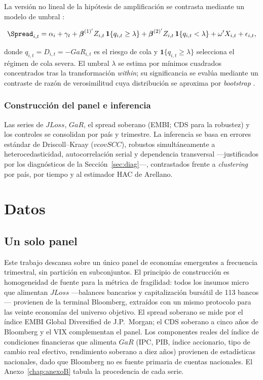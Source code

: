 La versión no lineal de la hipótesis de amplificación se contrasta mediante un modelo de umbral \citep{Hansen1999,Hansen2000}:

\[ \Spread_{i,t} = \alpha_i + \gamma_t + \boldsymbol{\beta}^{(1)'} Z_{i,t}\,\mathbf{1}\{q_{i,t}\ge\lambda\} + \boldsymbol{\beta}^{(2)'} Z_{i,t}\,\mathbf{1}\{q_{i,t}<\lambda\} + \omega'X_{i,t} + \epsilon_{i,t}, \]

donde $q_{i,t}=D_{i,t}=-GaR_{i,t}$ es el riesgo de cola y $\mathbf{1}\{q_{i,t}\ge\lambda\}$ selecciona el régimen de cola severa. El umbral $\lambda$ se estima por mínimos cuadrados concentrados tras la transformación \textit{within}; su significancia se evalúa mediante un contraste de razón de verosimilitud cuya distribución se aproxima por \textit{bootstrap} \citep{Hansen2000}.

\subsubsection{Construcción del panel e inferencia}

Las series de $JLoss$, $GaR$, el spread soberano (EMBI; CDS para la robustez) y los controles se consolidan por país y trimestre. La inferencia se basa en errores estándar de Driscoll–Kraay \citep{DriscollKraay1998} ($vcovSCC$), robustos simultáneamente a heterocedasticidad, autocorrelación serial y dependencia transversal —justificados por los diagnósticos de la Sección~\ref{sec:diag}—, contrastados frente a \textit{clustering} por país, por tiempo y al estimador HAC de Arellano.

\section{Datos}

\subsection{Un solo panel}

Este trabajo descansa sobre un único panel de economías emergentes a frecuencia trimestral, sin partición en subconjuntos. El principio de construcción es homogeneidad de fuente para la métrica de fragilidad: todos los insumos micro que alimentan $JLoss$ —balances bancarios y capitalización bursátil de 113 bancos— provienen de la terminal Bloomberg, extraídos con un mismo protocolo para las veinte economías del universo objetivo. El spread soberano se mide por el índice EMBI Global Diversified de J.P.\ Morgan; el CDS soberano a cinco años de Bloomberg y el VIX complementan el panel. Los componentes reales del índice de condiciones financieras que alimenta $GaR$ (IPC, PIB, índice accionario, tipo de cambio real efectivo, rendimiento soberano a diez años) provienen de estadísticas nacionales, dado que Bloomberg no es fuente primaria de cuentas nacionales. El Anexo~\ref{chap:anexoB} tabula la procedencia de cada serie.

